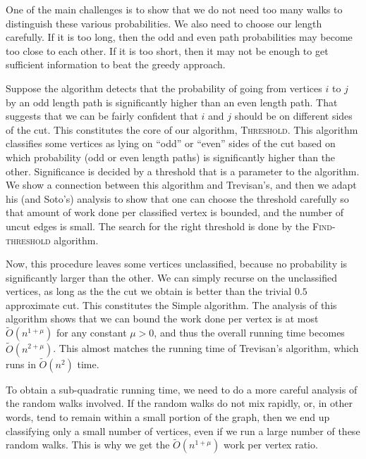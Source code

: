 \documentclass[11pt]{article}
\newcommand\Threshold{\textsc{Threshold}\xspace}
\newcommand\Find{\textsc{Find-threshold}\xspace}
\newcommand\Simple{{\sc Simple}\xspace}
\newcommand\otilde{\widetilde{O}}
\begin{document}
One of the main challenges is to show that we do not
need too many walks to distinguish these various
probabilities. We also need to choose our length
carefully. If it is too long, then the odd and even path
probabilities may become too close to each other.
If it is too short, then it may not be enough to
get sufficient information to beat the greedy
approach.


Suppose the algorithm detects that the probability of going from vertices $i$ to $j$ by an odd length path is significantly higher than an even length path. That suggests that we can be fairly confident that $i$ and $j$ should be on different sides of the cut.
This constitutes the core of our algorithm, \Threshold. This algorithm classifies some vertices as lying on ``odd'' or ``even'' sides of the cut based on which probability (odd or even length paths) is significantly higher than the other.  Significance is decided by a threshold that is a parameter to the algorithm. We show a connection between this algorithm and Trevisan's, and then we adapt his (and Soto's) analysis to show that one can choose the threshold carefully so that amount of work done per classified vertex is bounded, and the number of uncut edges is small. The search for the right threshold is done by the \Find algorithm.

Now, this procedure leaves some vertices unclassified, because no probability is significantly larger than the other. We can simply recurse on the unclassified vertices, as long as the the cut we obtain is better than the trivial $0.5$ approximate cut. This constitutes the \Simple algorithm. The analysis of this algorithm shows that we can bound the work done per vertex is at most $\otilde(n^{1+\mu})$ for any constant $\mu > 0$, and thus the overall running time becomes $\otilde(n^{2+\mu})$. This almost matches the running time of Trevisan's algorithm, which runs in $\otilde(n^2)$ time.


To obtain a sub-quadratic running time, we need to do a more careful analysis of the random walks involved. If the random walks do not mix rapidly, or, in other words, tend to remain within a small portion of the graph, then we end up classifying only a small number of vertices, even if we run a large number of these random walks. This is why we get the $\otilde(n^{1+\mu})$ work per vertex ratio.
\end{document}
